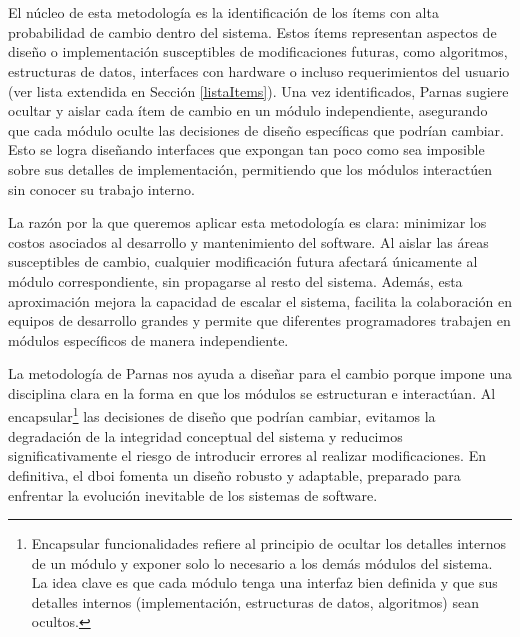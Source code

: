 \noindent{} 
\\\\
\indent
El núcleo de esta metodología es la identificación de los ítems con alta probabilidad de cambio dentro del sistema. Estos ítems representan aspectos de diseño o implementación susceptibles de modificaciones futuras, como algoritmos, estructuras de datos, interfaces con hardware o incluso requerimientos del usuario (ver lista extendida en Sección \ref{listaItems}). Una vez identificados, Parnas sugiere ocultar y aislar cada ítem de cambio en un módulo independiente, asegurando que cada módulo oculte las decisiones de diseño específicas que podrían cambiar. Esto se logra diseñando interfaces que expongan tan poco como sea imposible sobre sus detalles de implementación, permitiendo que los módulos interactúen sin conocer su trabajo interno. 

La razón por la que queremos aplicar esta metodología es clara: minimizar los costos asociados al desarrollo y mantenimiento del software. Al aislar las áreas susceptibles de cambio, cualquier modificación futura afectará únicamente al módulo correspondiente, sin propagarse al resto del sistema. Además, esta aproximación mejora la capacidad de escalar el sistema, facilita la colaboración en equipos de desarrollo grandes y permite que diferentes programadores trabajen en módulos específicos de manera independiente.

La metodología de Parnas nos ayuda a diseñar para el cambio porque impone una disciplina clara en la forma en que los módulos se estructuran e interactúan. Al encapsular\footnote{Encapsular funcionalidades refiere al principio de ocultar los detalles internos de un módulo y exponer solo lo necesario a los demás módulos del sistema. La idea clave es que cada módulo tenga una interfaz bien definida y que sus detalles internos (implementación, estructuras de datos, algoritmos) sean ocultos.} las decisiones de diseño que podrían cambiar, evitamos la degradación de la integridad conceptual del sistema y reducimos significativamente el riesgo de introducir errores al realizar modificaciones. En definitiva, el \gls{dboi} fomenta un diseño robusto y adaptable, preparado para enfrentar la evolución inevitable de los sistemas de software.


